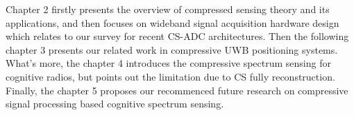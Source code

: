 Chapter 2 firstly presents the overview of compressed sensing theory and its applications, and then focuses on wideband signal acquisition hardware design which relates to our survey for recent CS-ADC architectures. Then the following chapter 3 presents our related work in compressive UWB positioning systems. What’s more, the chapter 4 introduces the compressive spectrum sensing for cognitive radios, but points out the limitation due to CS fully reconstruction. Finally, the chapter 5 proposes our recommenced future research on compressive signal processing based cognitive spectrum sensing.



